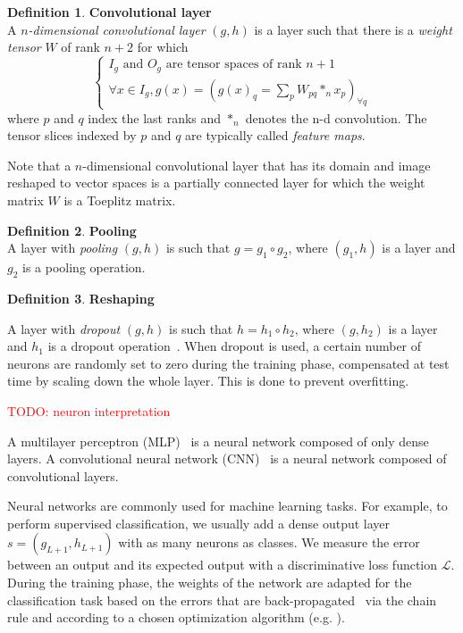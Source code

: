 \documentclass{article}
\theoremstyle{definition}
\newtheorem{definition}{Definition}[section]
\newcommand{\todo}[1]{\textcolor{red}{TODO: #1}}
\begin{document}
\begin{definition}\textbf{Convolutional layer}\\
A \textit{$n$-dimensional convolutional layer} $(g,h)$ is a layer such that there is a \textit{weight tensor} $W$ of rank $n+2$ for which
$$
\left\{
\begin{array}{l}
  I_g \mbox{ and } O_g \mbox{ are tensor spaces of rank }n+1 \\
  \forall x \in I_g, g(x) = (g(x)_q = \sum\limits_p{W_{pq} \ast_n x_p})_{\forall q}
\end{array}
\right.
$$
where $p$ and $q$ index the last ranks and $\ast_n$ denotes the n-d convolution. The tensor slices indexed by $p$ and $q$ are typically called \textit{feature maps}.
\end{definition}

Note that a $n$-dimensional convolutional layer that has its domain and image reshaped to vector spaces is a partially connected layer for which the weight matrix $W$ is a Toeplitz matrix.

\begin{definition}\textbf{Pooling}\\
A layer with \textit{pooling} $(g,h)$ is such that $g = g_1 \circ g_2$, where $(g_1,h)$ is a layer and $g_2$ is a pooling operation.
\end{definition}

\begin{definition}\textbf{Reshaping}\\
\end{definition}

A layer with \textit{dropout} $(g,h)$ is such that $h = h_1 \circ h_2$, where $(g,h_2)$ is a layer and $h_1$ is a dropout operation~\cite{srivastava2014dropout}. When dropout is used, a certain number of neurons are randomly set to zero during the training phase, compensated at test time by scaling down the whole layer. This is done to prevent overfitting.

\todo{neuron interpretation}

A multilayer perceptron (MLP)~\cite{hornik1989multilayer} is a neural network composed of only dense layers.
A convolutional neural network (CNN)~\cite{lecun1998gradient} is a neural network composed of convolutional layers.

Neural networks are commonly used for machine learning tasks. For example, to perform supervised classification, we usually add a dense output layer $s=(g_{L+1},h_{L+1})$ with as many neurons as classes. We measure the error between an output and its expected output with a discriminative loss function $\mathcal{L}$. During the training phase, the weights of the network are adapted for the classification task based on the errors that are back-propagated~\cite{hornik1989multilayer} via the chain rule and according to a chosen optimization algorithm (e.g. \cite{bottou2010large}).
\end{document}
